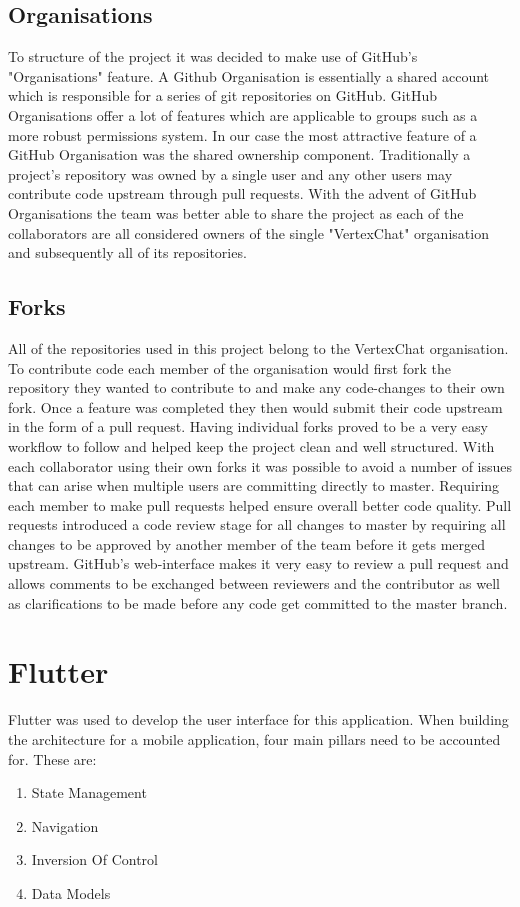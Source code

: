 \subsection{Organisations}
To structure of the project it was decided to make use of GitHub's "Organisations" feature. A Github Organisation is
essentially a shared account which is responsible for a series of git repositories on GitHub. GitHub Organisations offer a lot of features which are applicable to groups such as a more robust permissions system. In our case the most attractive feature of a GitHub Organisation was the shared ownership component. Traditionally a project's repository was owned by a single user and any other users may contribute code upstream through pull requests. With the advent of GitHub Organisations the team was better able to share the project as each of the collaborators are all considered owners of the single "VertexChat" organisation and subsequently all of its repositories.

\subsection{Forks}
All of the repositories used in this project belong to the VertexChat organisation. To contribute code each member of
the organisation would first fork the repository they wanted to contribute to and make any code-changes to their own fork. Once a feature was completed they then would submit their code upstream in the form of a pull request. Having individual forks proved to be a very easy workflow to follow and helped keep the project clean and well structured. With each collaborator using their own forks it was possible to avoid a number of issues that can arise when multiple users are committing directly to master. Requiring each member to make pull requests helped ensure overall better code quality.  Pull requests introduced a code review stage for all changes to master by requiring all changes to be approved by another member of the team before it gets merged upstream. GitHub's web-interface makes it very easy to review a pull request and allows comments to be exchanged between reviewers and the contributor as well as clarifications to be made before any code get committed to the master branch.

\section{Flutter}
Flutter was used to develop the user interface for this application. When building the architecture for a mobile application, four main pillars need to be accounted for. These are:
\begin{enumerate}
	\item State Management
	\item Navigation
	\item Inversion Of Control
	\item Data Models
\end{enumerate}

